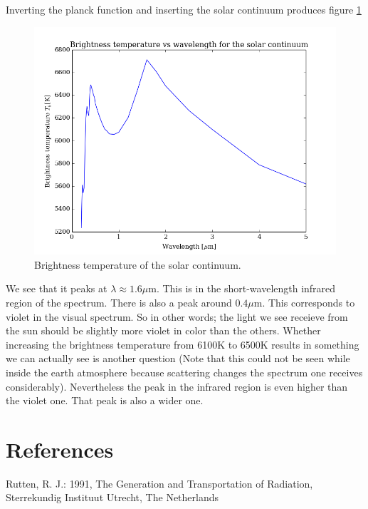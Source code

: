 \documentclass{aa}   %
\begin{document}
Inverting the planck function and inserting the solar continuum produces figure \ref{planck_invert}
\begin{figure}
 \includegraphics[width=.49\textwidth]{planck_invert.png}
 \caption{Brightness temperature of the solar continuum.}
 \label{planck_invert} 
\end{figure}
We see that it peaks at $\lambda \approx 1.6 \mu$m.
This is in the short-wavelength infrared region of the spectrum. There is also a peak around $0.4 \mu$m. This corresponds to violet in the visual spectrum. So in other words; the light we see receieve from the sun should be slightly more violet in color than the others. Whether increasing the brightness temperature from 6100K to 6500K results in something we can actually see is another question (Note that this could not be seen while inside the earth atmosphere because scattering changes the spectrum one receives considerably). Nevertheless the peak in the infrared region is even higher than the violet one. That peak is also a wider one.





\section{References}
Rutten, R. J.: 1991, The Generation and Transportation of Radiation, Sterrekundig Instituut Utrecht, The Netherlands

\end{document}
